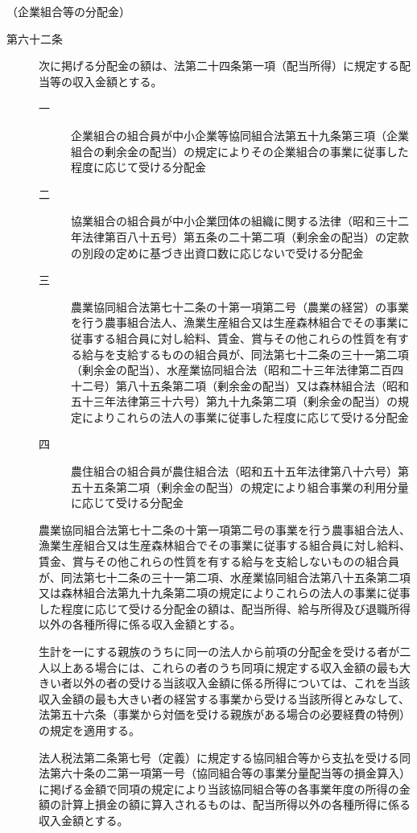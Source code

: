 \documentclass[twocolumn,a4j,10pt]{ltjtarticle}
\begin{document}
\noindent\hspace{10pt}（企業組合等の分配金）
\begin{description}
\item[第六十二条]次に掲げる分配金の額は、法第二十四条第一項（配当所得）に規定する配当等の収入金額とする。
\begin{description}
\item[一]企業組合の組合員が中小企業等協同組合法第五十九条第三項（企業組合の剰余金の配当）の規定によりその企業組合の事業に従事した程度に応じて受ける分配金
\item[二]協業組合の組合員が中小企業団体の組織に関する法律（昭和三十二年法律第百八十五号）第五条の二十第二項（剰余金の配当）の定款の別段の定めに基づき出資口数に応じないで受ける分配金
\item[三]農業協同組合法第七十二条の十第一項第二号（農業の経営）の事業を行う農事組合法人、漁業生産組合又は生産森林組合でその事業に従事する組合員に対し給料、賃金、賞与その他これらの性質を有する給与を支給するものの組合員が、同法第七十二条の三十一第二項（剰余金の配当）、水産業協同組合法（昭和二十三年法律第二百四十二号）第八十五条第二項（剰余金の配当）又は森林組合法（昭和五十三年法律第三十六号）第九十九条第二項（剰余金の配当）の規定によりこれらの法人の事業に従事した程度に応じて受ける分配金
\item[四]農住組合の組合員が農住組合法（昭和五十五年法律第八十六号）第五十五条第二項（剰余金の配当）の規定により組合事業の利用分量に応じて受ける分配金
\end{description}
\item[]農業協同組合法第七十二条の十第一項第二号の事業を行う農事組合法人、漁業生産組合又は生産森林組合でその事業に従事する組合員に対し給料、賃金、賞与その他これらの性質を有する給与を支給しないものの組合員が、同法第七十二条の三十一第二項、水産業協同組合法第八十五条第二項又は森林組合法第九十九条第二項の規定によりこれらの法人の事業に従事した程度に応じて受ける分配金の額は、配当所得、給与所得及び退職所得以外の各種所得に係る収入金額とする。
\item[]生計を一にする親族のうちに同一の法人から前項の分配金を受ける者が二人以上ある場合には、これらの者のうち同項に規定する収入金額の最も大きい者以外の者の受ける当該収入金額に係る所得については、これを当該収入金額の最も大きい者の経営する事業から受ける当該所得とみなして、法第五十六条（事業から対価を受ける親族がある場合の必要経費の特例）の規定を適用する。
\item[]法人税法第二条第七号（定義）に規定する協同組合等から支払を受ける同法第六十条の二第一項第一号（協同組合等の事業分量配当等の損金算入）に掲げる金額で同項の規定により当該協同組合等の各事業年度の所得の金額の計算上損金の額に算入されるものは、配当所得以外の各種所得に係る収入金額とする。
\end{description}
\end{document}
